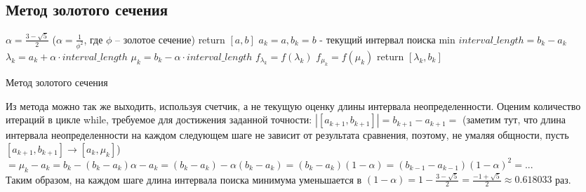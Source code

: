\documentclass[main.tex]{subfiles}
\begin{document}
	\subsection{Метод золотого сечения}
	\begin{algorithm}[H]\label{golden_ratio}
		
		
		$\alpha = \frac{3-\sqrt{5}}{2}$ ($\alpha = \frac{1}{\phi^2}$, где $\phi$ -- золотое сечение)\;
		 {return $[a, b]$}
		$a_k = a, b_k = b$ - текущий интервал поиска min\;
		$interval\_length = b_k - a_k$\;
		$\lambda_k = a_k + \alpha\cdot interval\_length$\;
		$\mu_k = b_k - \alpha\cdot interval\_length$\;
		$f_{\lambda_k} = f(\lambda_k)$\;
		$f_{\mu_k} = f(\mu_k)$\;
		return $[\lambda_k, b_k]$\;		
		\caption{Метод золотого сечения}
	\end{algorithm}\newpage
	Из метода можно так же выходить, используя счетчик, а не текущую оценку длины интервала неопределенности. Оценим количество итераций в цикле while, требуемое для достижения заданной точности: $|[a_{k+1}, b_{k+1}]| = b_{k+1} - a_{k+1} = $ (заметим тут, что длина интервала неопределенности на каждом следующем шаге не зависит от результата сравнения, поэтому, не умаляя общности, пусть $[a_{k+1}, b_{k+1}] \rightarrow [a_k, \mu_k]$) $ = \mu_k - a_k = b_k - (b_k - a_k)\alpha - a_k = (b_k - a_k) - \alpha(b_k - a_k) = (b_k - a_k)(1 - \alpha) = (b_{k-1} - a_{k-1})(1 - \alpha)^2 = ...$\\
	Таким образом, на каждом шаге длина интервала поиска минимума уменьшается в \newline $(1 - \alpha) = 1 -  \frac{3-\sqrt{5}}{2} = \frac{-1 +\sqrt{5}}{2} \approx 0.618033$ раз.\\
\end{document}
